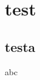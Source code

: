 \documentclass{beamer}
\begin{document}
\section{test}
\subsection{testa}
\begin{frame}
    abc
\end{frame} 
\end{document}

